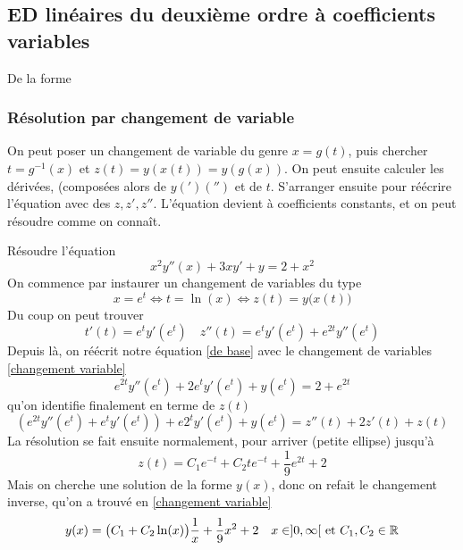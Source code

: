 \documentclass[12pt,a4paper]{article}
\renewcommand{\)}{\right)}
\renewcommand{\(}{\left(}
\begin{document}
\subsection{ED linéaires du deuxième ordre à coefficients variables}
De la forme 
\subsubsection{Résolution par changement de variable}
On peut poser un changement de variable du genre $x=g(t)$, puis chercher $t = g^{-1}(x)$ et $z(t) = y(x(t)) = y(g(x))$. On peut ensuite calculer les dérivées, (composées alors de $y(')('')$ et de $t$. S'arranger ensuite pour réécrire l'équation avec des $z,z',z''$. L'équation devient à coefficients constants, et on peut résoudre comme on connaît.
\begin{exemple}
	\setcounter{equation}{0}
	Résoudre l'équation 
	\begin{equation}
		x^2y''(x) + 3xy' + y = 2+x^2
		\label{de base}
	\end{equation} 
	On commence par instaurer un changement de variables du type 
	\begin{equation}
		x = e^t \iff t = \ln(x) \iff z(t) = y\big(x(t)\big)
		\label{changement variable}
	\end{equation}		
	Du coup on peut trouver 
	\begin{equation*}
		t'(t) = e^ty'\(e^t\)\quad z''(t) = e^ty'\(e^t\) + e^{2t}y''\(e^t\)	
	\end{equation*}		
 	Depuis là, on réécrit notre équation \eqref{de base} avec le changement de variables \eqref{changement variable}
	\begin{equation*}
		e^{2t}y''(e^t) + 2e^ty'(e^t) + y(e^t) = 2 + e^{2t}
	\end{equation*}	 		
	qu'on identifie finalement en terme de $z(t)$ 
 	\begin{equation*}
 		\(e^{2t}y''(e^t) + e^ty'(e^t)\) + e2^ty'(e^t) + y(e^t) = z''(t) + 2z'(t) + z(t)
	\end{equation*} 	 
 	  La résolution se fait ensuite normalement, pour arriver (petite ellipse) jusqu'à 
 	\begin{equation*}
		z(t) = C_1e^{-t} + C_2te^{-t} + \frac{1}{9}e^{2t} + 2
	\end{equation*} 	  
	Mais on cherche une solution de la forme $y(x)$, donc on refait le changement inverse, qu'on a trouvé en \eqref{changement variable}
	\begin{equation*}
		y(x) = \big(C_1 + C_2\ln(x)\big)\frac{1}{x} + \frac{1}{9}x^2 + 2 \quad x\in ]0,\infty[ \mbox{ et } C_1,C_2 \in \mathbb{R}
	\end{equation*}
\end{exemple}
\end{document}
